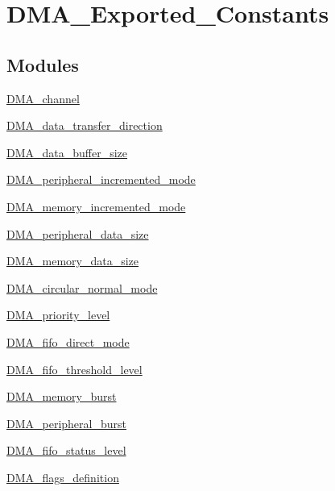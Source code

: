 \hypertarget{group___d_m_a___exported___constants}{\section{D\-M\-A\-\_\-\-Exported\-\_\-\-Constants}
\label{group___d_m_a___exported___constants}
}
\subsection*{Modules}
\begin{DoxyCompactItemize}
\item 
\hyperlink{group___d_m_a__channel}{D\-M\-A\-\_\-channel}
\item 
\hyperlink{group___d_m_a__data__transfer__direction}{D\-M\-A\-\_\-data\-\_\-transfer\-\_\-direction}
\item 
\hyperlink{group___d_m_a__data__buffer__size}{D\-M\-A\-\_\-data\-\_\-buffer\-\_\-size}
\item 
\hyperlink{group___d_m_a__peripheral__incremented__mode}{D\-M\-A\-\_\-peripheral\-\_\-incremented\-\_\-mode}
\item 
\hyperlink{group___d_m_a__memory__incremented__mode}{D\-M\-A\-\_\-memory\-\_\-incremented\-\_\-mode}
\item 
\hyperlink{group___d_m_a__peripheral__data__size}{D\-M\-A\-\_\-peripheral\-\_\-data\-\_\-size}
\item 
\hyperlink{group___d_m_a__memory__data__size}{D\-M\-A\-\_\-memory\-\_\-data\-\_\-size}
\item 
\hyperlink{group___d_m_a__circular__normal__mode}{D\-M\-A\-\_\-circular\-\_\-normal\-\_\-mode}
\item 
\hyperlink{group___d_m_a__priority__level}{D\-M\-A\-\_\-priority\-\_\-level}
\item 
\hyperlink{group___d_m_a__fifo__direct__mode}{D\-M\-A\-\_\-fifo\-\_\-direct\-\_\-mode}
\item 
\hyperlink{group___d_m_a__fifo__threshold__level}{D\-M\-A\-\_\-fifo\-\_\-threshold\-\_\-level}
\item 
\hyperlink{group___d_m_a__memory__burst}{D\-M\-A\-\_\-memory\-\_\-burst}
\item 
\hyperlink{group___d_m_a__peripheral__burst}{D\-M\-A\-\_\-peripheral\-\_\-burst}
\item 
\hyperlink{group___d_m_a__fifo__status__level}{D\-M\-A\-\_\-fifo\-\_\-status\-\_\-level}
\item 
\hyperlink{group___d_m_a__flags__definition}{D\-M\-A\-\_\-flags\-\_\-definition}

\end{DoxyCompactItemize}
